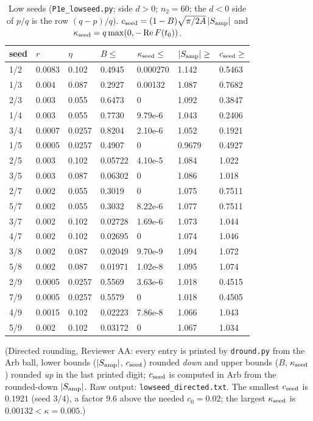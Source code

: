 \documentclass[11pt]{article}
\theoremstyle{definition}\newtheorem{definition}[theorem]{Definition}
\theoremstyle{remark}\newtheorem{remark}[theorem]{Remark}
\begin{document}
\begin{table}[h]\centering\small
\caption{Low seeds (\texttt{P1e\_lowseed.py}; side $d>0$; $n_2=60$; the $d<0$ side of $p/q$ is the row $(q-p)/q$). $c_{\rm seed}=(1-B)\sqrt{\pi/2A}\,|S_{\rm amp}|$ and $\kappa_{\rm seed}=q\max(0,-\operatorname{Re}F(t_0))$.}\label{tab:low}
\begin{tabular}{lllllll}\toprule
seed & $r$ & $\eta$ & $B\le$ & $\kappa_{\rm seed}\le$ & $|S_{\rm amp}|\ge$ & $c_{\rm seed}\ge$\\\midrule
1/2 & 0.0083 & 0.102 & 0.4945 & 0.000270 & 1.142 & 0.5463 \\
1/3 & 0.004 & 0.087 & 0.2927 & 0.00132 & 1.087 & 0.7682 \\
2/3 & 0.003 & 0.055 & 0.6473 & 0 & 1.092 & 0.3847 \\
1/4 & 0.003 & 0.055 & 0.7730 & 9.79e-6 & 1.043 & 0.2406 \\
3/4 & 0.0007 & 0.0257 & 0.8204 & 2.10e-6 & 1.052 & 0.1921 \\
1/5 & 0.0005 & 0.0257 & 0.4907 & 0 & 0.9679 & 0.4927 \\
2/5 & 0.003 & 0.102 & 0.05722 & 4.10e-5 & 1.084 & 1.022 \\
3/5 & 0.003 & 0.087 & 0.06302 & 0 & 1.086 & 1.018 \\
2/7 & 0.002 & 0.055 & 0.3019 & 0 & 1.075 & 0.7511 \\
5/7 & 0.002 & 0.055 & 0.3032 & 8.22e-6 & 1.077 & 0.7511 \\
3/7 & 0.002 & 0.102 & 0.02728 & 1.69e-6 & 1.073 & 1.044 \\
4/7 & 0.002 & 0.102 & 0.02695 & 0 & 1.074 & 1.046 \\
3/8 & 0.002 & 0.087 & 0.02049 & 9.70e-9 & 1.094 & 1.072 \\
5/8 & 0.002 & 0.087 & 0.01971 & 1.02e-8 & 1.095 & 1.074 \\
2/9 & 0.0005 & 0.0257 & 0.5569 & 3.63e-6 & 1.018 & 0.4515 \\
7/9 & 0.0005 & 0.0257 & 0.5579 & 0 & 1.018 & 0.4505 \\
4/9 & 0.0015 & 0.102 & 0.02223 & 7.86e-8 & 1.066 & 1.043 \\
5/9 & 0.002 & 0.102 & 0.03172 & 0 & 1.067 & 1.034 \\
\bottomrule
\end{tabular}\end{table}
(Directed rounding, Reviewer AA: every entry is printed by \texttt{dround.py} from the Arb ball, lower bounds ($|S_{\rm amp}|$, $c_{\rm seed}$) rounded \emph{down} and upper bounds ($B$, $\kappa_{\rm seed}$) rounded \emph{up} in the last printed digit; $c_{\rm seed}$ is computed in Arb from the rounded-down $|S_{\rm amp}|$. Raw output: \texttt{lowseed\_directed.txt}. The smallest $c_{\rm seed}$ is $0.1921$ (seed $3/4$), a factor $9.6$ above the needed $c_0=0.02$; the largest $\kappa_{\rm seed}$ is $0.00132<\kappa=0.005$.)
\end{document}
